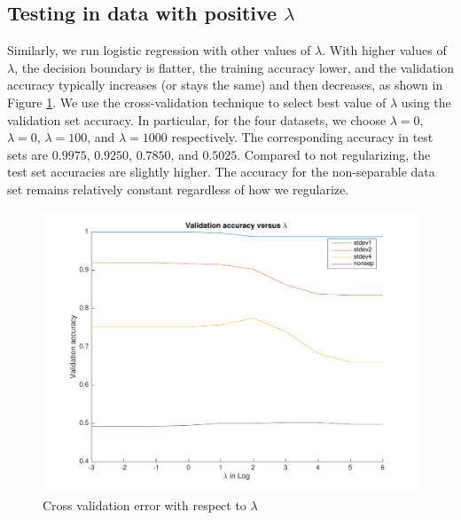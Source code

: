 \subsection{Testing in data with positive $\lambda$}
Similarly, we run logistic regression with other values of $\lambda$. With higher values of $\lambda$, the decision boundary is flatter, the training accuracy lower, and the validation accuracy typically increases (or stays the same) and then decreases, as shown in Figure \ref{fig:LR_cv}. We use the cross-validation technique to select best value of $\lambda$ using the validation set accuracy. In particular, for the four datasets, we choose $\lambda = 0$, $\lambda = 0$, $\lambda = 100$, and $\lambda = 1000$ respectively. The corresponding accuracy in test sets are $0.9975$, $0.9250$, $0.7850$, and $0.5025$. Compared to not regularizing, the test set accuracies are slightly higher. The accuracy for the non-separable data set remains relatively constant regardless of how we regularize. 
\begin{figure}[hb]
\centering
	\includegraphics[scale=0.6]{hw2_1_cv.pdf}
	\caption{Cross validation error with respect to $\lambda$}\label{fig:LR_cv}
\end{figure}
	